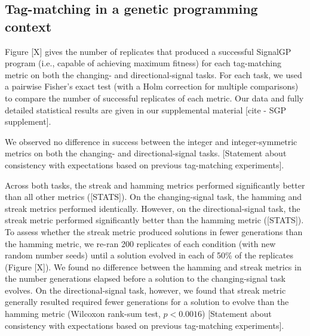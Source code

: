 \subsection{Tag-matching in a genetic programming context}



Figure [X] gives the number of replicates that produced a successful SignalGP program (i.e., capable of achieving maximum fitness) for each tag-matching metric on both the changing- and directional-signal tasks.
For each task, we used a pairwise Fisher's exact test (with a Holm correction for multiple comparisons) to compare the number of successful replicates of each metric.
Our data and fully detailed statistical results are given in our supplemental material [cite - SGP supplement].

We observed no difference in success between the integer and integer-symmetric metrics on both the changing- and directional-signal tasks.
[Statement about consistency with expectations based on previous tag-matching experiments].

Across both tasks, the streak and hamming metrics performed significantly better than all other metrics ([STATS]).
On the changing-signal task, the hamming and streak metrics performed identically.
However, on the directional-signal task, the streak metric performed significantly better than the hamming metric ([STATS]).
To assess whether the streak metric produced solutions in fewer generations than the hamming metric, we re-ran 200 replicates of each condition (with new random number seeds) until a solution evolved in each of 50\% of the replicates (Figure [X]).
We found no difference between the hamming and streak metrics in the number generations elapsed before a solution to the changing-signal task evolves.
On the directional-signal task, however, we found that streak metric generally resulted required fewer generations for a solution to evolve than the hamming metric (Wilcoxon rank-sum test, $p < 0.0016$)
[Statement about consistency with expectations based on previous tag-matching experiments].

